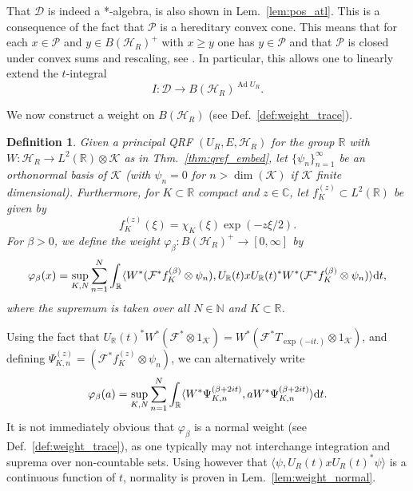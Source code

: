 \documentclass[sn-mathphys-num]{sn-jnl}%
\newcommand{\CC}{\mathbb{C}}
\newcommand{\RR}{\mathbb{R}}
\newcommand{\HH}{\mathcal{H}}
\newcommand{\KK}{\mathcal{K}}
\DeclareMathOperator{\Ad}{Ad}
\newcommand{\diff}{\textup{d}}
\numberwithin{equation}{section}
\theoremstyle{thmstyleone}%
\theoremstyle{thmstyletwo}%
\theoremstyle{thmstylethree}%
\newtheorem{definition}[theorem]{Definition}%
\begin{document}
That $\mathcal{D}$ is indeed a *-algebra, is also shown in Lem.\ \ref{lem:pos_atl}. This is a consequence of the fact that $\mathcal{P}$ is a hereditary convex cone. This means that for each $x\in\mathcal{P}$ and $y\in B(\HH_R)^+$ with $x\geq y$ one has $y\in \mathcal{P}$ and that $\mathcal{P}$ is closed under convex sums and rescaling, see \cite[Lem.~VII.1.2]{takesaki2002}. In particular, this allows one to linearly extend the $t$-integral 
\begin{equation}
    I:\mathcal{D}\to B(\HH_R)^{\Ad U_R}.
\end{equation}

We now construct a weight on $B(\HH_R)$ (see Def.\ \ref{def:weight_trace}). 
\begin{definition}
    \label{def:beta_weight}
    Given a principal QRF $(U_R,E,\HH_R)$ for the group $\RR$ with $W:\HH_R\to L^2(\RR)\otimes\KK$ as in Thm.\ \ref{thm:qref_embed}, let $\{\psi_n\}_{n=1}^\infty$ be an orthonormal basis of $\KK$ (with $\psi_n=0$ for $n>\dim(\KK)$ if $\KK$ finite dimensional). Furthermore, for $K\subset\RR$ compact and $z\in\CC$, let $f_K^{(z)}\subset L^2(\RR)$ be given by
    \begin{equation}
        f_K^{(z)}(\xi)=\chi_K(\xi)\exp(-z\xi/2).
    \end{equation}
    For $\beta>0$, we define the weight $\varphi_\beta:B(\HH_R)^+\to [0,\infty]$ by
    \begin{equation}
        \varphi_\beta(x)=\sup_{K,N}\sum_{n=1}^N\int_\RR \langle W^*(\mathcal{F}^*f_K^{(\beta)}\otimes \psi_n),U_\RR(t)xU_\RR(t)^*W^*(\mathcal{F}^*f_K^{(\beta)}\otimes \psi_n)\rangle\diff t,
    \end{equation}
    where the supremum is taken over all $N\in\mathbb{N}$ and $K\subset \RR$.
\end{definition}
Using the fact that $U_\RR(t)^*W^*(\mathcal{F}^*\otimes 1_{\KK})=W^*(\mathcal{F}^*T_{\exp(-it.)}\otimes 1_{\KK})$, and defining $\Psi_{K,n}^{(z)}=(\mathcal{F}^*f_K^{(z)}\otimes \psi_n)$, we can alternatively write
\begin{equation}
        \varphi_\beta(a)=\sup_{K,N}\sum_{n=1}^N\int_\RR \langle W^*\Psi_{K,n}^{(\beta+2it)},aW^*\Psi_{K,n}^{(\beta+2it)}\rangle\diff t.
    \end{equation}
It is not immediately obvious that $\varphi_\beta$ is a normal weight (see Def.\ \ref{def:weight_trace}), as one typically may not interchange integration and suprema over non-countable sets. Using however that $\langle \psi, U_R(t)xU_R(t)^*\psi\rangle$ is a continuous function of $t$, normality is proven in Lem.\ \ref{lem:weight_normal}.
\end{document}
